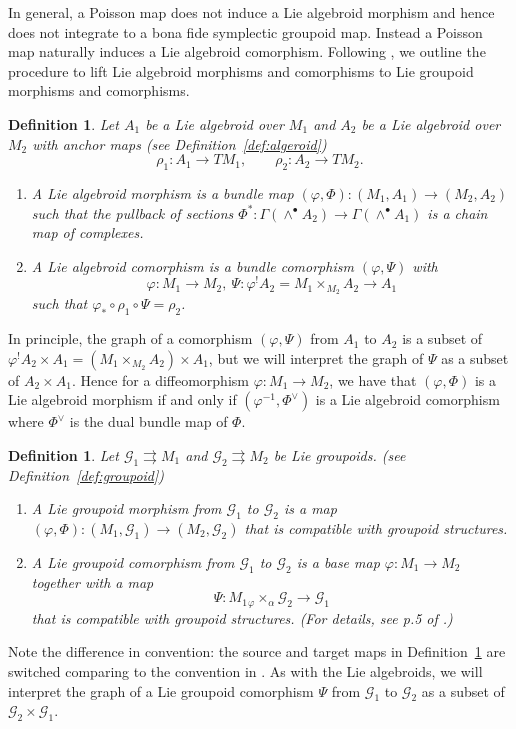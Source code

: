 \documentclass{amsart}
\newtheorem{definition}[theorem]{Definition}
\numberwithin{equation}{section}
\newcommand{\cG}{\mathcal{G}}
\newcommand{\rra}{\rightrightarrows}
\begin{document}
In general, a Poisson map does not induce a Lie algebroid morphism and hence does not integrate to a bona fide symplectic groupoid map.
Instead a Poisson map naturally induces a Lie algebroid comorphism.
Following \cite{CDW13}, we outline the procedure to lift Lie algebroid morphisms and comorphisms to Lie groupoid morphisms and comorphisms.
\begin{definition} 
  \cite{HM90, Mac05, CDW13}
 	Let $A_1$ be a Lie algebroid over $M_1$ and $A_2$ be a Lie algebroid over $M_2$ with anchor maps (see Definition~\ref{def:algeroid})
 	\[ \rho_1: A_1 \to TM_1, \qquad \rho_2: A_2 \to TM_2. \]
 	\begin{enumerate}
 		\item A Lie algebroid morphism is a bundle map $(\varphi, \Phi): (M_1, A_1) \to (M_2, A_2)$ such that the pullback of sections $\Phi^*: \Gamma(\wedge^\bullet A_2) \to \Gamma(\wedge^\bullet A_1)$ is a chain map of complexes.
 		\item A Lie algebroid comorphism is a bundle comorphism $(\varphi, \Psi)$ with
 			\[ \varphi: M_1 \to M_2,~ \Psi: \varphi^! A_2 = M_1 {\times_{M_2}} A_2 \to A_1 \]
 			such that $\varphi_* \circ \rho_1 \circ \Psi = \rho_2$. 
 	\end{enumerate}
\end{definition}
In principle, the graph of a comorphism $(\varphi, \Psi)$ from $A_1$ to $A_2$ is a subset of $\varphi^! A_2 \times A_1 = \left(M_1 {\times_{M_2}} A_2 \right) \times A_1$, but we will interpret the graph of $\Psi$ as a subset of $A_2 \times A_1$. Hence for a diffeomorphism $\varphi: M_1 \to M_2$, we have that $(\varphi, \Phi)$ is a Lie algebroid morphism if and only if $(\varphi^{-1}, \Phi^\vee)$ is a Lie algebroid comorphism where $\Phi^\vee$ is the dual bundle map of $\Phi$.
\begin{definition} \cite{Mac05, CDW13} \label{def:gpdcomor}
	Let $\cG_1 \rra M_1$ and $\cG_2 \rra M_2$ be Lie groupoids. (see Definition~\ref{def:groupoid})
	\begin{enumerate}
 		\item A Lie groupoid morphism from $\cG_1$ to $\cG_2$ is a map $(\varphi, \Phi): (M_1, \cG_1) \to (M_2, \cG_2)$ that is compatible with groupoid structures. 
 		\item A Lie groupoid comorphism from $\cG_1$ to $\cG_2$ is a base map $\varphi: M_1 \to M_2$ together with a map
 			\[ \Psi: M_1 {_\varphi \times_\alpha} \cG_2 \to \cG_1 \]
 		that is compatible with groupoid structures. (For details, see p.5 of \cite{CDW13}.) 
 	\end{enumerate}
\end{definition}
Note the difference in convention: the source and target maps in Definition~\ref{def:gpdcomor} are switched comparing to the convention in \cite{CDW13}.
As with the Lie algebroids, we will interpret the graph of a Lie groupoid comorphism $\Psi$ from $\cG_1$ to $\cG_2$ as a subset of $\cG_2 \times \cG_1$.
\end{document}
